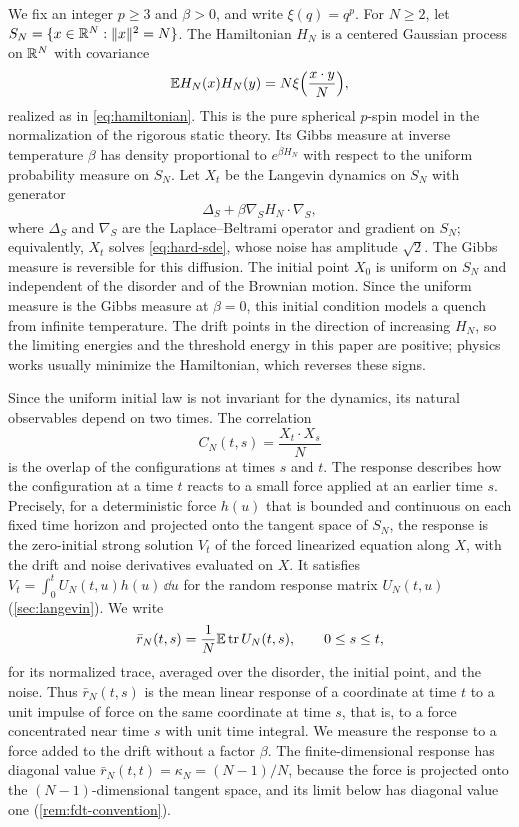 We fix an integer $p\ge3$ and $\beta>0$, and write $\xi(q)=q^p$. For $N\ge2$, let $S_N=\{x\in\mathbb R^N:\lVert x\rVert^2=N\}$. The Hamiltonian $H_N$ is a centered Gaussian process on $\mathbb R^N$ with covariance
\[
 \mathbb E H_N(x)H_N(y)=N\xi\Bigl(\frac{x\cdot y}{N}\Bigr),
\]
realized as in \eqref{eq:hamiltonian}. This is the pure spherical $p$-spin model in the normalization of the rigorous static theory. Its Gibbs measure at inverse temperature $\beta$ has density proportional to $e^{\beta H_N}$ with respect to the uniform probability measure on $S_N$. Let $X_t$ be the Langevin dynamics on $S_N$ with generator
\[
 \Delta_S+\beta\nabla_SH_N\cdot\nabla_S,
\]
where $\Delta_S$ and $\nabla_S$ are the Laplace--Beltrami operator and gradient on $S_N$; equivalently, $X_t$ solves \eqref{eq:hard-sde}, whose noise has amplitude $\sqrt2$. The Gibbs measure is reversible for this diffusion. The initial point $X_0$ is uniform on $S_N$ and independent of the disorder and of the Brownian motion. Since the uniform measure is the Gibbs measure at $\beta=0$, this initial condition models a quench from infinite temperature. The drift points in the direction of increasing $H_N$, so the limiting energies and the threshold energy in this paper are positive; physics works usually minimize the Hamiltonian, which reverses these signs.

Since the uniform initial law is not invariant for the dynamics, its natural observables depend on two times. The correlation
\[
 C_N(t,s)=\frac{X_t\cdot X_s}N
\]
is the overlap of the configurations at times $s$ and $t$. The response describes how the configuration at a time $t$ reacts to a small force applied at an earlier time $s$. Precisely, for a deterministic force $h(u)$ that is bounded and continuous on each fixed time horizon and projected onto the tangent space of $S_N$, the response is the zero-initial strong solution $V_t$ of the forced linearized equation along $X$, with the drift and noise derivatives evaluated on $X$. It satisfies $V_t=\int_0^tU_N(t,u)h(u)\,\dd u$ for the random response matrix $U_N(t,u)$ (\cref{sec:langevin}). We write
\[
 \bar r_N(t,s)=\frac1N\mathbb E\operatorname{tr} U_N(t,s),\qquad 0\le s\le t,
\]
for its normalized trace, averaged over the disorder, the initial point, and the noise. Thus $\bar r_N(t,s)$ is the mean linear response of a coordinate at time $t$ to a unit impulse of force on the same coordinate at time $s$, that is, to a force concentrated near time $s$ with unit time integral. We measure the response to a force added to the drift without a factor $\beta$. The finite-dimensional response has diagonal value $\bar r_N(t,t)=\kappa_N=(N-1)/N$, because the force is projected onto the $(N-1)$-dimensional tangent space, and its limit below has diagonal value one (\cref{rem:fdt-convention}).

